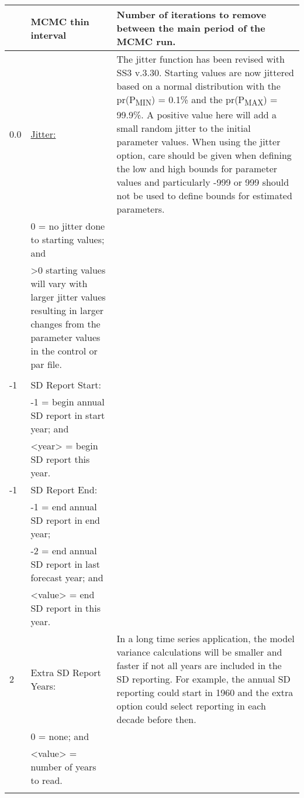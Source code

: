 {\begin{landscape}
\begin{longtable}{p{1.5cm} p{7.2cm} p{12.3cm}}
 \pagebreak
 200 & MCMC thin interval & Number of iterations to remove between the main period of the MCMC run. \Tstrut\\
	   
 \hline 
 0.0 & \hyperlink{Jitter}{Jitter:} & \multirow{1}{1cm}[-0.25cm]{\parbox{12.5cm}{The jitter function has been revised with SS3 v.3.30.  Starting values are now jittered based on a normal distribution with the pr(P\textsubscript{MIN}) = 0.1\% and the pr(P\textsubscript{MAX}) = 99.9\%. A positive value here will add a small random jitter to the initial parameter values.  When using the jitter option, care should be given when defining the low and high bounds for parameter values and particularly -999 or 999 should not be used to define bounds for estimated parameters.}}\Tstrut\\ 
	 & 0 = no jitter done to starting values; and & \\
	 & >0 starting values will vary with larger jitter values resulting in larger changes from the parameter values in the control or par file. & \\
	 & & \\
	
 \hline
 -1 & SD Report Start: & \Tstrut\\
    & -1 = begin annual SD report in start year; and & \\
    & <year> = begin SD report this year. & \\
	      
 \hline
 -1 & SD Report End: & \Tstrut\\
    & -1 = end annual SD report in end year; & \\
    & -2 = end annual SD report in last forecast year; and & \\
    & <value> = end SD report in this year. & \\
	   
 \hline
 2 & Extra SD Report Years: & \multirow{1}{1cm}[-0.25cm]{\parbox{12.5cm}{In a long time series application, the model variance calculations will be smaller and faster if not all years are included in the SD reporting.  For example, the annual SD reporting could start in 1960 and the extra option could select reporting in each decade before then.}}\Tstrut\\
   & 0 = none; and & \\
   & <value> = number of years to read. &  \\
   & & \\


\end{longtable}
\end{landscape}}
